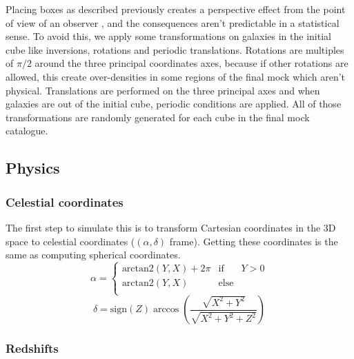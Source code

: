 Placing boxes as described previously creates a perspective effect from the
point of view of an observer \citep{Blaizot+05}, and the consequences aren't
predictable in a statistical sense. To avoid this, we apply some
transformations on galaxies in the initial cube like inversions, rotations and
periodic translations. Rotations are multiples of $\pi/2$ around the three
principal coordinates axes, because if other rotations are allowed, this create
over-densities in some regions of the final mock which aren't physical.
Translations are performed on the three principal axes and when galaxies are
out of the initial cube, periodic conditions are applied. All of those
transformations are randomly generated for each cube in the final mock
catalogue.

\subsection{Physics}

\subsubsection{Celestial coordinates}

The first step to simulate this is to transform Cartesian coordinates in the
3D space to celestial coordinates ($(\alpha,\delta)$ frame). Getting these
coordinates is the same as computing spherical coordinates.
%
\begin{equation}
    \alpha=\left\{ \begin{array}{lcr}
     \mbox{arctan2} \left(Y, X\right)+2\pi & \mbox{if} & Y>0 \\
     \mbox{arctan2} \left(Y, X\right) & \mbox{else} & \\
    \end{array}\right.\nonumber%
\end{equation}
%
\begin{equation}
    \delta=\mbox{sign} \left(Z\right)
    \arccos\left(\frac{\sqrt{X^2+Y^2}}{\sqrt{X^2+Y^2+Z^2}}\right)
\end{equation}

\subsubsection{Redshifts}

